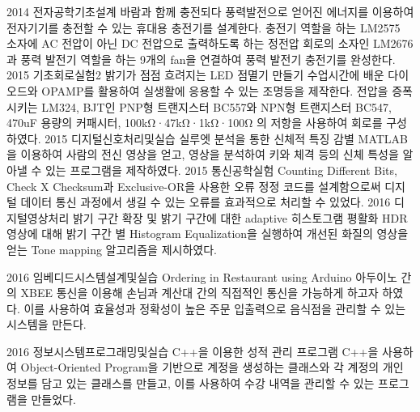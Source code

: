\documentclass[]{friggeri-cv}
\begin{document}
\begin{entrylist}
  \entry
{2014}
{전자공학기초설계}
{ 바람과 함께 충전되다}
{풍력발전으로 얻어진 에너지를 이용하여 전자기기를 충전할 수 있는 휴대용 충전기를 설계한다. 충전기 역할을 하는 LM2575 소자에 AC 전압이 아닌 DC 전압으로 출력하도록 하는 정전압 회로의 소자인 LM2676과 풍력 발전기 역할을 하는 9개의 fan을 연결하여 풍력 발전기 충전기를 완성한다.}
\entry
{2015}
{기초회로실험2}
{ 밝기가 점점 흐려지는 LED 점멸기 만들기}
{수업시간에 배운 다이오드와 OPAMP를 활용하여 실생활에 응용할 수 있는 조명등을 제작한다. 전압을 증폭시키는 LM324, BJT인 PNP형 트랜지스터 BC557와 NPN형 트랜지스터 BC547, 470uF 용량의 커패시터, 100kΩ·47kΩ·1kΩ·100Ω 의 저항을 사용하여 회로를 구성하였다.}
\entry
{2015}
{디지털신호처리및실습}
{ 실루엣 분석을 통한 신체적 특징 감별}
{ MATLAB을 이용하여 사람의 전신 영상을 얻고, 영상을 분석하여 키와 체격 등의 신체 특성을 알아낼 수 있는 프로그램을 제작하였다. }
\entry
{2015}
{통신공학실험}
{ Counting Different Bits, Check X}
{Checksum과 Exclusive-OR을 사용한 오류 정정 코드를 설계함으로써 디지털 데이터 통신 과정에서 생길 수 있는 오류를 효과적으로 처리할 수 있었다.}
\entry
{2016}
{디지털영상처리}
{ 밝기 구간 확장 및 밝기 구간에 대한 adaptive 히스토그램 평활화 }
{ HDR 영상에 대해 밝기 구간 별 Histogram Equalization을 실행하여 개선된 화질의 영상을 얻는 Tone mapping 알고리즘을 제시하였다. }

\entry
{2016}
{임베디드시스템설계및실습}
{ Ordering in Restaurant using Arduino}
{ 아두이노 간의 XBEE 통신을 이용해 손님과 계산대 간의 직접적인 통신을 가능하게 하고자 하였다. 이를 사용하여 효율성과 정확성이 높은 주문 입출력으로 음식점을 관리할 수 있는 시스템을 만든다.}

\entry
{2016}
{정보시스템프로그래밍및실습}
{ C++을 이용한 성적 관리 프로그램}
{ C++을 사용하여 Object-Oriented Program을 기반으로 계정을 생성하는 클래스와 각 계정의 개인 정보를 담고 있는 클래스를 만들고, 이를 사용하여 수강 내역을 관리할 수 있는 프로그램을 만들었다.}
\end{entrylist}
\end{document}
